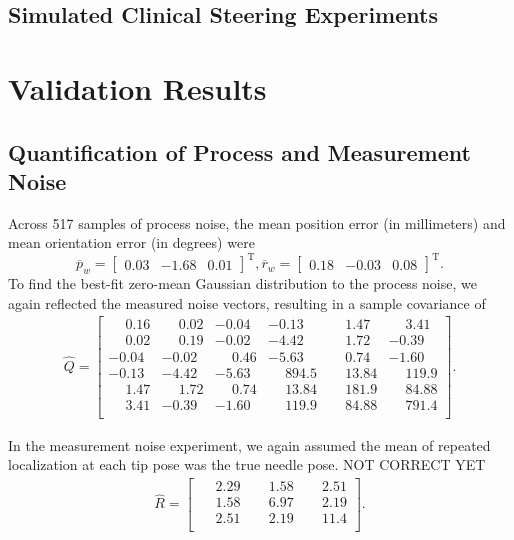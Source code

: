 \subsection{Simulated Clinical Steering Experiments}


\section{Validation Results}
\label{sec:HumanInTheLoopResults}

\subsection{Quantification of Process and Measurement Noise}
Across 517 samples of process noise, the mean position error (in millimeters) and mean orientation error (in degrees) were \[{\overline{p}_{w}} = \begin{bmatrix} 0.03 &-1.68 &0.01 \end{bmatrix}^{\text{T}}, {\overline{r}_{w}} = \begin{bmatrix} 0.18 &-0.03 &0.08 \end{bmatrix}^{\text{T}}.\] To find the best-fit zero-mean Gaussian distribution to the process noise, we again reflected the measured noise vectors, resulting in a sample covariance of
\begin{align*}
{\hat{Q}} = \begin{bmatrix} 
\phantom{-}0.16 & \phantom{-}0.02 	&-0.04 & -0.13 & \phantom{-}1.47 & \phantom{-}3.41\\
\phantom{-}0.02 & \phantom{-}0.19 & -0.02 & -4.42 & \phantom{-}1.72 & -0.39 \\ 
-0.04 & -0.02 & \phantom{-}0.46 & -5.63 & \phantom{-}0.74 & -1.60 \\
-0.13 & -4.42 & -5.63 & \phantom{-}894.5 & \phantom{-}13.84 & \phantom{-}119.9 \\
\phantom{-}1.47 & \phantom{-}1.72 & \phantom{-}0.74 & \phantom{-}13.84 & \phantom{-}181.9 & \phantom{-}84.88 \\
\phantom{-}3.41 & -0.39 & -1.60 & \phantom{-}119.9 & \phantom{-}84.88 & \phantom{-}791.4\\ 
\end{bmatrix}.
\end{align*}

In the measurement noise experiment, we again assumed the mean of repeated localization at each tip pose was the true needle pose. NOT CORRECT YET
\begin{align*}
{\hat{R}} = \begin{bmatrix} 
\phantom{-}2.29 & \phantom{-}1.58 & \phantom{-}2.51 \\ 
\phantom{-}1.58 & \phantom{-}6.97 & \phantom{-}2.19 \\ 
\phantom{-}2.51 & \phantom{-}2.19 & \phantom{-}11.4 \\ 
\end{bmatrix}.
\end{align*}
